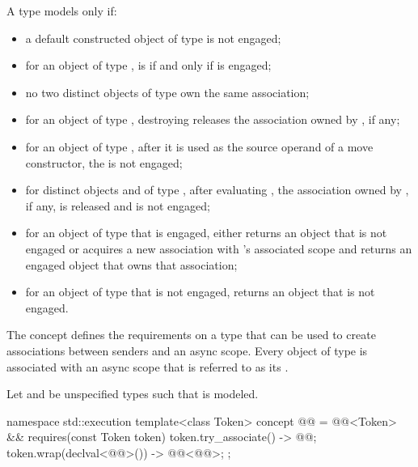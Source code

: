 \pnum
A type  models  only if:
\begin{itemize}
\item
a default constructed object of type  is not engaged;
\item
for an object  of type ,
 is 
if and only if  is engaged;
\item
no two distinct objects of type  own the same association;
\item
for an object  of type ,
destroying  releases the association owned by , if any;
\item
for an object  of type ,
after it is used as the source operand of a move constructor,
the  is not engaged;
\item
for distinct objects  and  of type ,
after evaluating ,
the association owned by , if any, is released and
 is not engaged;
\item
for an object  of type  that is engaged,
 either
returns an object that is not engaged or
acquires a new association with 's associated scope and
returns an engaged object that owns that association;
\item
for an object  of type  that is not engaged,
 returns an object that is not engaged.
\end{itemize}

\pnum
The  concept defines the requirements on
a type  that can be used to create associations
between senders and an async scope.
Every object of type  is associated with an async scope
that is referred to as its .

\pnum
Let  and 
be unspecified types such that
is modeled.

\begin{codeblock}
namespace std::execution {
  template<class Token>
    concept @@ =
      @@<Token> &&
      requires(const Token token) {
        { token.try_associate() } -> @@;
        { token.wrap(declval<@@>()) } -> @@<@@>;
      };
}
\end{codeblock}


